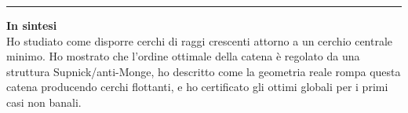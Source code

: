 \documentclass[11pt,a4paper]{article}
\newcommand{\custombox}[2]{
  \par\smallskip\noindent
  \colorbox{softgray}{
    \begin{minipage}{\dimexpr\textwidth-2\fboxsep\relax}
      \vspace{0.5em}
      \hspace{0.8em}%
      \begin{minipage}{\dimexpr\textwidth-2\fboxsep-1.6em\relax}
        {\color{navy}\textbf{\normalsize #1}} \\[0.2em]
        \color{charcoal}\small #2
      \end{minipage}%
      \vspace{0.5em}
    \end{minipage}
  }\par\smallskip
}
\begin{document}
\hrule
\vspace{0.5em}

\custombox{In sintesi}{
    Ho studiato come disporre cerchi di raggi crescenti attorno a un cerchio centrale minimo. Ho mostrato che l'ordine ottimale della catena è regolato da una struttura Supnick/anti-Monge, ho descritto come la geometria reale rompa questa catena producendo cerchi flottanti, e ho certificato gli ottimi globali per i primi casi non banali.
}
\end{document}
